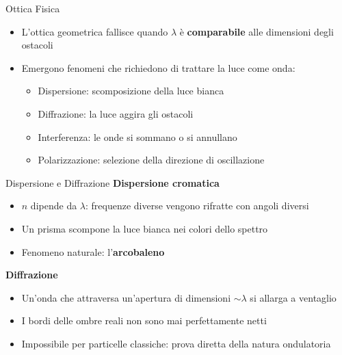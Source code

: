 \begin{frame}{Ottica Fisica}
    \begin{itemize}
        \item L'ottica geometrica fallisce quando $\lambda$ è \textbf{comparabile} alle dimensioni degli ostacoli
        \item  Emergono fenomeni che richiedono di trattare la luce come onda:
        \begin{itemize}
            \item Dispersione: scomposizione della luce bianca
            \item Diffrazione: la luce aggira gli ostacoli
            \item Interferenza: le onde si sommano o si annullano
            \item Polarizzazione: selezione della direzione di oscillazione
        \end{itemize}
    \end{itemize}
\end{frame}


\begin{frame}{Dispersione e Diffrazione}
    \textbf{Dispersione cromatica}
    \begin{itemize}
        \item $n$ dipende da $\lambda$: frequenze diverse vengono rifratte con angoli diversi
        \item Un prisma scompone la luce bianca nei colori dello spettro
        \item Fenomeno naturale: l'\textbf{arcobaleno}
    \end{itemize}
    \vspace{0.3cm}
    \textbf{Diffrazione}
    \begin{itemize}
        \item Un'onda che attraversa un'apertura di dimensioni $\sim \lambda$ si allarga a ventaglio
        \item I bordi delle ombre reali non sono mai perfettamente netti
        \item Impossibile per particelle classiche: prova diretta della natura ondulatoria
    \end{itemize}
\end{frame}

